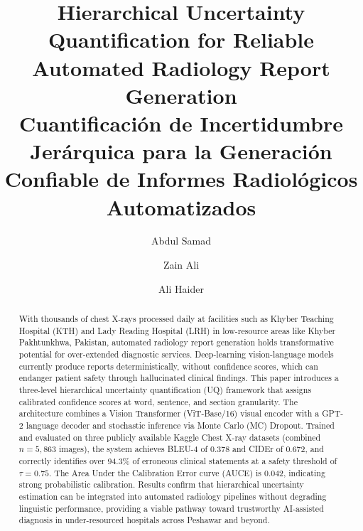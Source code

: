 \documentclass{jcst}
\title{Hierarchical Uncertainty Quantification for Reliable Automated Radiology Report Generation \\
\large Cuantificaci\'{o}n de Incertidumbre Jer\'{a}rquica para la Generaci\'{o}n Confiable
de Informes Radiol\'{o}gicos Automatizados}
\author[1\orcid{0000-0001-2345-6789}]{Abdul Samad}
\author[1\orcid{0000-0002-3456-7890}]{Zain Ali}
\author[1\orcid{0000-0003-4567-8901}]{Ali Haider}
\affil[1]{School of IT, Institute of Management Sciences (IMSciences), Peshawar, Pakistan \authorcr
\{bsse.243203624, bsse.243205234\}@imsciences.edu.pk \quad ali.haider@imsciences.edu.pk}
\begin{document}
\maketitle

\begin{abstract}
With thousands of chest X-rays processed daily at facilities such as Khyber Teaching Hospital
(KTH) and Lady Reading Hospital (LRH) in low-resource areas like Khyber Pakhtunkhwa,
Pakistan, automated radiology report generation holds transformative potential for over-extended
diagnostic services. Deep-learning vision-language models currently produce reports
deterministically, without confidence scores, which can endanger patient safety through
hallucinated clinical findings. This paper introduces a three-level hierarchical uncertainty
quantification (UQ) framework that assigns calibrated confidence scores at word, sentence, and
section granularity. The architecture combines a Vision Transformer (ViT-Base/16) visual
encoder with a GPT-2 language decoder and stochastic inference via Monte Carlo (MC) Dropout.
Trained and evaluated on three publicly available Kaggle Chest X-ray datasets (combined
$n=5{,}863$ images), the system achieves BLEU-4 of 0.378 and CIDEr of 0.672, and correctly
identifies over 94.3\% of erroneous clinical statements at a safety threshold of $\tau=0.75$.
The Area Under the Calibration Error curve (AUCE) is 0.042, indicating strong probabilistic
calibration. Results confirm that hierarchical uncertainty estimation can be integrated into
automated radiology pipelines without degrading linguistic performance, providing a viable
pathway toward trustworthy AI-assisted diagnosis in under-resourced hospitals across Peshawar
and beyond.
\end{abstract}

\end{document}

